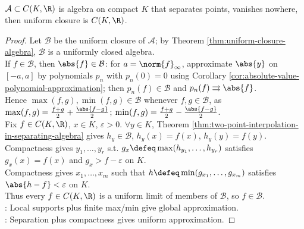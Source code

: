 \begin{theorem} \label{thm:real-stone-weierstrass} \\
$\mathcal{A}\subset C(K,\R)$ is algebra on compact $K$ that separates points, vanishes nowhere, then uniform closure is $C(K,\R)$.
\begin{proof}
Let $\mathcal{B}$ be the uniform closure of $\mathcal{A}$; by Theorem \ref{thm:uniform-closure-algebra}, $\mathcal{B}$ is a uniformly closed algebra.\\
If $f\in\mathcal{B}$, then $\abs{f}\in\mathcal{B}$: for $a=\norm{f}_{\infty}$, approximate $\abs{y}$ on $[-a,a]$ by polynomials $p_n$ with $p_n(0)=0$ using Corollary \ref{cor:absolute-value-polynomial-approximation}; then $p_n(f)\in\mathcal{B}$ and $p_n(f)\rightrightarrows\abs{f}$.\\
Hence $\max(f,g),\min(f,g)\in\mathcal{B}$ whenever $f,g\in\mathcal{B}$, as $\max(f,g)=\frac{f+g}{2}+\frac{\abs{f-g}}{2}$; $\min(f,g)=\frac{f+g}{2}-\frac{\abs{f-g}}{2}$.\\
Fix $f\in C(K,\R)$, $x\in K$, $\varepsilon>0$. $\forall y\in K$, Theorem \ref{thm:two-point-interpolation-in-separating-algebra} gives $h_y\in\mathcal{B}$, $h_y(x)=f(x)$, $h_y(y)=f(y)$.\\
Compactness gives $y_1,\ldots,y_r$ s.t. $g_x\defeq\max(h_{y_1},\ldots,h_{y_r})$ satisfies $g_x(x)=f(x)$ and $g_x>f-\varepsilon$ on $K$.\\
Compactness gives $x_1,\ldots,x_m$ such that $h\defeq\min(g_{x_1},\ldots,g_{x_m})$ satisfies $\abs{h-f}<\varepsilon$ on $K$.\\
Thus every $f\in C(K,\R)$ is a uniform limit of members of $\mathcal{B}$, so $f\in\mathcal{B}$.\\
: Local supports plus finite max/min give global approximation.\\
: Separation plus compactness gives uniform approximation.
\end{proof}
\end{theorem}


